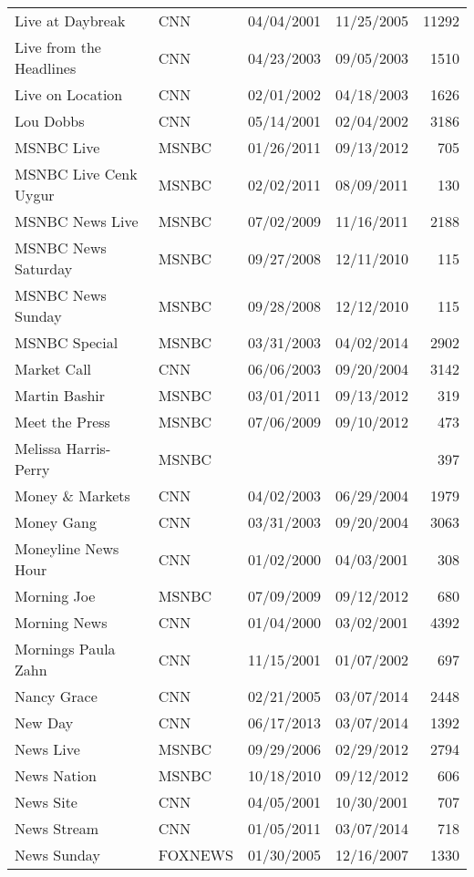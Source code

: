 {\begin{longtable}{llllr}
  Live at Daybreak & CNN & 04/04/2001 & 11/25/2005 & 11292 \\ 
  Live from the Headlines & CNN & 04/23/2003 & 09/05/2003 & 1510 \\ 
  Live on Location & CNN & 02/01/2002 & 04/18/2003 & 1626 \\ 
  Lou Dobbs & CNN & 05/14/2001 & 02/04/2002 & 3186 \\ 
  MSNBC Live & MSNBC & 01/26/2011 & 09/13/2012 & 705 \\ 
  MSNBC Live Cenk Uygur & MSNBC & 02/02/2011 & 08/09/2011 & 130 \\ 
  MSNBC News Live & MSNBC & 07/02/2009 & 11/16/2011 & 2188 \\ 
  MSNBC News Saturday & MSNBC & 09/27/2008 & 12/11/2010 & 115 \\ 
  MSNBC News Sunday & MSNBC & 09/28/2008 & 12/12/2010 & 115 \\ 
  MSNBC Special & MSNBC & 03/31/2003 & 04/02/2014 & 2902 \\ 
  Market Call & CNN & 06/06/2003 & 09/20/2004 & 3142 \\ 
  Martin Bashir & MSNBC & 03/01/2011 & 09/13/2012 & 319 \\ 
  Meet the Press & MSNBC & 07/06/2009 & 09/10/2012 & 473 \\ 
  Melissa Harris-Perry & MSNBC &  &  & 397 \\ 
  Money \& Markets & CNN & 04/02/2003 & 06/29/2004 & 1979 \\ 
  Money Gang & CNN & 03/31/2003 & 09/20/2004 & 3063 \\ 
  Moneyline News Hour & CNN & 01/02/2000 & 04/03/2001 & 308 \\ 
  Morning Joe & MSNBC & 07/09/2009 & 09/12/2012 & 680 \\ 
  Morning News & CNN & 01/04/2000 & 03/02/2001 & 4392 \\ 
  Mornings Paula Zahn & CNN & 11/15/2001 & 01/07/2002 & 697 \\ 
  Nancy Grace & CNN & 02/21/2005 & 03/07/2014 & 2448 \\ 
  New Day & CNN & 06/17/2013 & 03/07/2014 & 1392 \\ 
  News Live & MSNBC & 09/29/2006 & 02/29/2012 & 2794 \\ 
  News Nation & MSNBC & 10/18/2010 & 09/12/2012 & 606 \\ 
  News Site & CNN & 04/05/2001 & 10/30/2001 & 707 \\ 
  News Stream & CNN & 01/05/2011 & 03/07/2014 & 718 \\ 
  News Sunday & FOXNEWS & 01/30/2005 & 12/16/2007 & 1330 \\ 

\end{longtable}}
